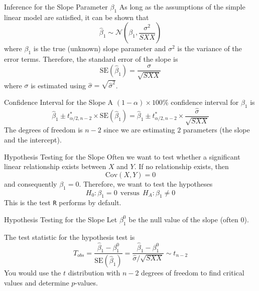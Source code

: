 \documentclass{beamer}
\begin{document}
\begin{frame}{Inference for the Slope Parameter $\beta_1$}
    As long as the assumptions of the simple linear model are satisfied, it can be shown that 
    \begin{equation*}
        \hat{\beta}_1 \sim \mathcal{N}\left(\beta_1, \frac{\sigma^2}{SXX}\right)
    \end{equation*}
    where $\beta_1$ is the true (unknown) slope parameter and $\sigma^2$ is the variance of the error terms. Therefore, the standard error of the slope is 
    \begin{equation*}
        \textrm{SE}(\hat{\beta}_1) = \frac{\sigma}{\sqrt{SXX}}
    \end{equation*}
    where $\sigma$ is estimated using $\hat{\sigma} = \sqrt{\hat{\sigma}^2}$. 
\end{frame}

\begin{frame}{Confidence Interval for the Slope}
    A $(1-\alpha)\times 100$\% confidence interval for $\beta_1$ is 
    \begin{equation*}
        \hat{\beta}_1 \pm t^*_{\alpha/2, n-2} \times \textrm{SE}(\hat{\beta}_1) = \hat{\beta}_1 \pm t^*_{\alpha/2, n-2} \times \frac{\hat{\sigma}}{\sqrt{SXX}}
    \end{equation*}
    The degrees of freedom is $n-2$ since we are estimating $2$ parameters (the slope and the intercept).
\end{frame}

\begin{frame}{Hypothesis Testing for the Slope}
    Often we want to test whether a significant linear relationship exists between $X$ and $Y$. If no relationship exists, then 
    \begin{equation*}
        \textrm{Cov}(X, Y) = 0
    \end{equation*}
    and consequently $\beta_1 = 0$. Therefore, we want to test the hypotheses 
    \begin{equation*}
        H_0: \beta_1 = 0\ \ \textrm{versus}\ \ H_A: \beta_1 \neq 0
    \end{equation*}
    This is the test \texttt{R} performs by default.
\end{frame}

\begin{frame}{Hypothesis Testing for the Slope}
    Let $\beta_1^{0}$ be the null value of the slope (often $0$). 

    \vspace*{1em}
    The test statistic for the hypothesis test is 
    \begin{equation*}
        T_{obs} = \frac{\hat{\beta}_1 - \beta_1^{0}}{\textrm{SE}(\hat{\beta}_1)} = \frac{\hat{\beta}_1 - \beta_1^{0}}{\hat{\sigma} / \sqrt{SXX}} \sim t_{n-2}
    \end{equation*}
    You would use the $t$ distribution with $n-2$ degrees of freedom to find critical values and determine $p$-values. 
\end{frame}
\end{document}
